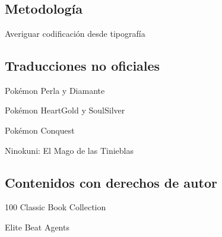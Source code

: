 
\appendix
\section{\appendixname}
\frame{\tableofcontents}

\subsection{Metodología}
\begin{frame}{Averiguar codificación desde tipografía}

\end{frame}

\subsection{Traducciones no oficiales}
\begin{frame}{Pokémon Perla y Diamante}
\end{frame}

\begin{frame}{Pokémon HeartGold y SoulSilver}

\end{frame}

\begin{frame}{Pokémon Conquest}

\end{frame}

\begin{frame}{Ninokuni: El Mago de las Tinieblas}

\end{frame}

\subsection{Contenidos con derechos de autor}
\begin{frame}{100 Classic Book Collection}

\end{frame}

\begin{frame}{Elite Beat Agents}

\end{frame}

